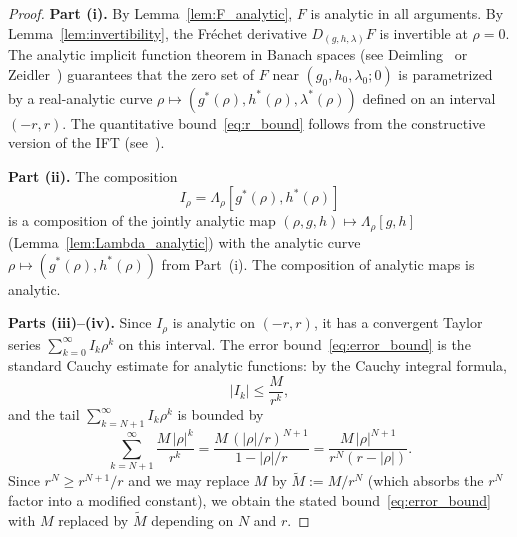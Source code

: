 \documentclass[11pt]{article}
\theoremstyle{definition}
\begin{document}
\begin{proof}
\textbf{Part (i).} By Lemma~\ref{lem:F_analytic}, $F$ is analytic in all arguments. By Lemma~\ref{lem:invertibility}, the Fr\'echet derivative $D_{(g,h,\lambda)}F$ is invertible at $\rho = 0$. The analytic implicit function theorem in Banach spaces (see Deimling~\cite[Theorem~15.3]{Deimling} or Zeidler~\cite[Theorem~4.H]{Zeidler}) guarantees that the zero set of $F$ near $(g_0, h_0, \lambda_0; 0)$ is parametrized by a real-analytic curve $\rho \mapsto (g^*(\rho), h^*(\rho), \lambda^*(\rho))$ defined on an interval $(-r, r)$. The quantitative bound~\eqref{eq:r_bound} follows from the constructive version of the IFT (see~\cite[Theorem~4.36]{BonnansShapiro}).

\textbf{Part (ii).} The composition
\begin{equation}
  I_\rho = \Lambda_\rho[g^*(\rho), h^*(\rho)]
\end{equation}
is a composition of the jointly analytic map $(\rho, g, h) \mapsto \Lambda_\rho[g,h]$ (Lemma~\ref{lem:Lambda_analytic}) with the analytic curve $\rho \mapsto (g^*(\rho), h^*(\rho))$ from Part~(i). The composition of analytic maps is analytic.

\textbf{Parts (iii)--(iv).} Since $I_\rho$ is analytic on $(-r,r)$, it has a convergent Taylor series $\sum_{k=0}^\infty I_k\rho^k$ on this interval. The error bound~\eqref{eq:error_bound} is the standard Cauchy estimate for analytic functions: by the Cauchy integral formula,
\begin{equation}
  |I_k| \leq \frac{M}{r^k},
\end{equation}
and the tail $\sum_{k=N+1}^\infty I_k \rho^k$ is bounded by
\begin{equation}
  \sum_{k=N+1}^\infty \frac{M\,|\rho|^k}{r^k} = \frac{M\,(|\rho|/r)^{N+1}}{1 - |\rho|/r} = \frac{M\,|\rho|^{N+1}}{r^N(r - |\rho|)}.
\end{equation}
Since $r^N \geq r^{N+1}/r$ and we may replace $M$ by $\tilde{M} := M/r^N$ (which absorbs the $r^N$ factor into a modified constant), we obtain the stated bound~\eqref{eq:error_bound} with $M$ replaced by $\tilde{M}$ depending on $N$ and $r$.
\end{proof}
\end{document}
